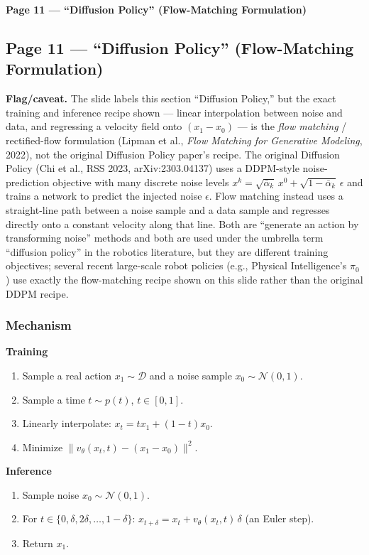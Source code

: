 \bigskip

\textbf{Page 11 --- ``Diffusion Policy'' (Flow-Matching Formulation)}

\subsection*{Page 11 --- ``Diffusion Policy'' (Flow-Matching Formulation)}

\textbf{Flag/caveat.} The slide labels this section ``Diffusion Policy,'' but the exact training and inference recipe shown --- linear interpolation between noise and data, and regressing a velocity field onto $(x_1-x_0)$ --- is the \emph{flow matching} / rectified-flow formulation (Lipman et al., \emph{Flow Matching for Generative Modeling}, 2022), not the original Diffusion Policy paper's recipe. The original Diffusion Policy (Chi et al., RSS 2023, arXiv:2303.04137) uses a DDPM-style noise-prediction objective with many discrete noise levels $x^k = \sqrt{\bar\alpha_k}\, x^0 + \sqrt{1-\bar\alpha_k}\,\epsilon$ and trains a network to predict the injected noise $\epsilon$. Flow matching instead uses a straight-line path between a noise sample and a data sample and regresses directly onto a constant velocity along that line. Both are ``generate an action by transforming noise'' methods and both are used under the umbrella term ``diffusion policy'' in the robotics literature, but they are different training objectives; several recent large-scale robot policies (e.g., Physical Intelligence's $\pi_0$) use exactly the flow-matching recipe shown on this slide rather than the original DDPM recipe.

\subsubsection*{Mechanism}

\textbf{Training}
\begin{enumerate}
\item Sample a real action $x_1 \sim \mathcal{D}$ and a noise sample $x_0 \sim \mathcal{N}(0,1)$.
\item Sample a time $t \sim p(t)$, $t\in[0,1]$.
\item Linearly interpolate: $x_t = t x_1 + (1-t)x_0$.
\item Minimize $\lVert v_\theta(x_t, t) - (x_1 - x_0)\rVert^2$.
\end{enumerate}
\textbf{Inference}
\begin{enumerate}
\item Sample noise $x_0 \sim \mathcal{N}(0,1)$.
\item For $t \in \{0,\delta,2\delta,\dots,1-\delta\}$: $x_{t+\delta} = x_t + v_\theta(x_t,t)\,\delta$ (an Euler step).
\item Return $x_1$.
\end{enumerate}

